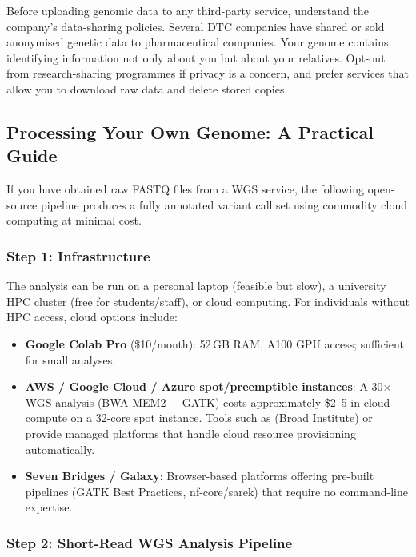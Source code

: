 \begin{warningbox}[title={Data Privacy and Ownership}]
Before uploading genomic data to any third-party service, understand the company's data-sharing policies. Several DTC companies have shared or sold anonymised genetic data to pharmaceutical companies. Your genome contains identifying information not only about you but about your relatives. Opt-out from research-sharing programmes if privacy is a concern, and prefer services that allow you to download raw data and delete stored copies.
\end{warningbox}

\subsection{Processing Your Own Genome: A Practical Guide}
\label{subsec:demo:processing}

If you have obtained raw FASTQ files from a WGS service, the following open-source pipeline produces a fully annotated variant call set using commodity cloud computing at minimal cost.

\subsubsection{Step 1: Infrastructure}

The analysis can be run on a personal laptop (feasible but slow), a university HPC cluster (free for students/staff), or cloud computing. For individuals without HPC access, cloud options include:

\begin{itemize}[nosep]
  \item \textbf{Google Colab Pro} (\$10/month): 52\,GB RAM, A100 GPU access; sufficient for small analyses.
  \item \textbf{AWS / Google Cloud / Azure spot/preemptible instances}: A 30$\times$ WGS analysis (BWA-MEM2 + GATK) costs approximately \$2--5 in cloud compute on a 32-core spot instance. Tools such as  (Broad Institute) or  provide managed platforms that handle cloud resource provisioning automatically.
  \item \textbf{Seven Bridges / Galaxy}: Browser-based platforms offering pre-built pipelines (GATK Best Practices, nf-core/sarek) that require no command-line expertise.
\end{itemize}

\subsubsection{Step 2: Short-Read WGS Analysis Pipeline}

